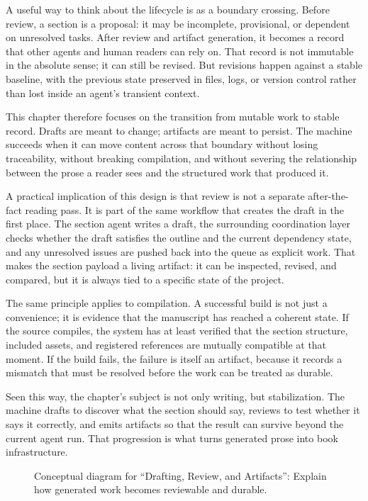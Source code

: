 \documentclass[11pt]{article}
\begin{document}
A useful way to think about the lifecycle is as a boundary crossing. Before review, a section is a proposal: it may be incomplete, provisional, or dependent on unresolved tasks. After review and artifact generation, it becomes a record that other agents and human readers can rely on. That record is not immutable in the absolute sense; it can still be revised. But revisions happen against a stable baseline, with the previous state preserved in files, logs, or version control rather than lost inside an agent's transient context.

This chapter therefore focuses on the transition from mutable work to stable record. Drafts are meant to change; artifacts are meant to persist. The machine succeeds when it can move content across that boundary without losing traceability, without breaking compilation, and without severing the relationship between the prose a reader sees and the structured work that produced it.

A practical implication of this design is that review is not a separate after-the-fact reading pass. It is part of the same workflow that creates the draft in the first place. The section agent writes a draft, the surrounding coordination layer checks whether the draft satisfies the outline and the current dependency state, and any unresolved issues are pushed back into the queue as explicit work. That makes the section payload a living artifact: it can be inspected, revised, and compared, but it is always tied to a specific state of the project.

The same principle applies to compilation. A successful build is not just a convenience; it is evidence that the manuscript has reached a coherent state. If the source compiles, the system has at least verified that the section structure, included assets, and registered references are mutually compatible at that moment. If the build fails, the failure is itself an artifact, because it records a mismatch that must be resolved before the work can be treated as durable.

Seen this way, the chapter's subject is not only writing, but stabilization. The machine drafts to discover what the section should say, reviews to test whether it says it correctly, and emits artifacts so that the result can survive beyond the current agent run. That progression is what turns generated prose into book infrastructure.

\begin{figure}[htbp]
\centering

\caption{Conceptual diagram for ``Drafting, Review, and Artifacts'': Explain how generated work becomes reviewable and durable.}
\end{figure}
\end{document}
